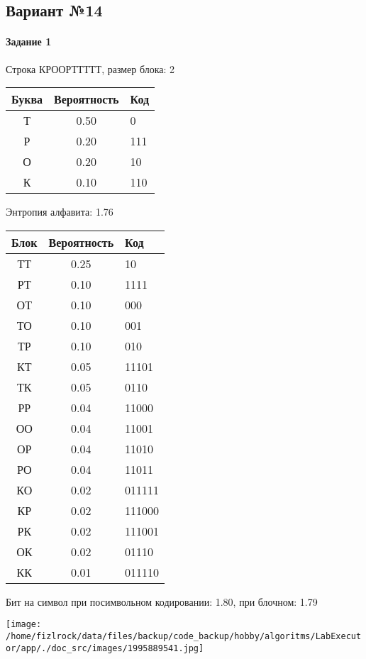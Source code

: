 \documentclass[a4paper, 12pt]{article}
\begin{document}
\subsection{Вариант №14}
\paragraph{Задание 1}

Строка КРООРТТТТТ, размер блока: 2
\begin{center}
 \begin{tabular}{ |c|c|l| } 
  \hline
     Буква & Вероятность & Код\\ \hline
Т & 0.50 & 0\\\hline
Р & 0.20 & 111\\\hline
О & 0.20 & 10\\\hline
К & 0.10 & 110
\\ \hline \end{tabular}
\end{center}
Энтропия алфавита: 1.76
\begin{center}
 \begin{tabular}{ |c|c|l| } 
  \hline
     Блок & Вероятность & Код\\ \hline
ТТ & 0.25 & 10\\\hline
РТ & 0.10 & 1111\\\hline
ОТ & 0.10 & 000\\\hline
ТО & 0.10 & 001\\\hline
ТР & 0.10 & 010\\\hline
КТ & 0.05 & 11101\\\hline
ТК & 0.05 & 0110\\\hline
РР & 0.04 & 11000\\\hline
ОО & 0.04 & 11001\\\hline
ОР & 0.04 & 11010\\\hline
РО & 0.04 & 11011\\\hline
КО & 0.02 & 011111\\\hline
КР & 0.02 & 111000\\\hline
РК & 0.02 & 111001\\\hline
ОК & 0.02 & 01110\\\hline
КК & 0.01 & 011110
\\ \hline \end{tabular}
\end{center}
Бит на символ при посимвольном кодировании: 1.80, при блочном: 1.79

\texttt{[image: /home/fizlrock/data/files/backup/code\_backup/hobby/algoritms/LabExecutor/app/./doc\_src/images/1995889541.jpg]}
\end{document}
